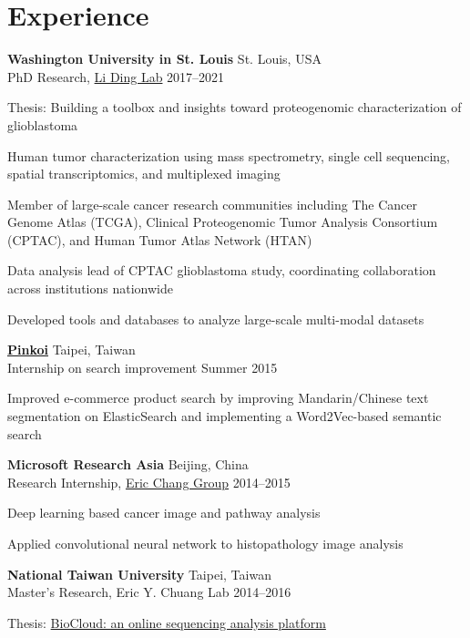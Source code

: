 \section{Experience}
\begin{entrylist}

\item \textbf{Washington University in St. Louis} \hfill St. Louis, USA\\
PhD Research, \href{https://dinglab.wustl.edu/}{Li Ding Lab} \hfill
2017--2021
\begin{detaillist}
    \item Thesis: Building a toolbox and insights toward proteogenomic characterization of glioblastoma
    \item Human tumor characterization using mass spectrometry, single cell sequencing, spatial transcriptomics, and multiplexed imaging
    \item Member of large-scale cancer research communities including The Cancer Genome Atlas (TCGA), Clinical Proteogenomic Tumor Analysis Consortium (CPTAC), and Human Tumor Atlas Network (HTAN)
    \item Data analysis lead of CPTAC glioblastoma study, coordinating collaboration across institutions nationwide
    \item Developed tools and databases to analyze large-scale multi-modal datasets
\end{detaillist}

\item \href{http://pinkoi.com}{\textbf{Pinkoi}} \hfill Taipei, Taiwan\\
Internship on search improvement \hfill
Summer 2015
\begin{detaillist}
    \item Improved e-commerce product search by improving Mandarin/Chinese text segmentation on ElasticSearch and implementing a Word2Vec-based semantic search
\end{detaillist}

\item \textbf{Microsoft Research Asia} \hfill Beijing, China\\
Research Internship, \href{https://www.microsoft.com/en-us/research/people/echang/}{Eric Chang Group} \hfill
2014--2015
\begin{detaillist}
    \item Deep learning based cancer image and pathway analysis
    \item Applied convolutional neural network to histopathology image analysis
\end{detaillist}

\item \textbf{National Taiwan University} \hfill Taipei, Taiwan\\
Master's Research, Eric Y. Chuang Lab \hfill
2014--2016
\begin{detaillist}
    \item Thesis: \href{https://doi.org/10.6342/NTU201601295}{BioCloud: an online sequencing analysis platform}
\end{detaillist}

\end{entrylist}
